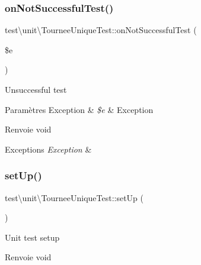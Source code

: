 \subsubsection{\texorpdfstring{on\+Not\+Successful\+Test()}{onNotSuccessfulTest()}}
{\footnotesize\ttfamily test\textbackslash{}unit\textbackslash{}\+Tournee\+Unique\+Test\+::on\+Not\+Successful\+Test (\begin{DoxyParamCaption}\item[{Exception}]{\$e }\end{DoxyParamCaption})\hspace{0.3cm}{\ttfamily [protected]}}

Unsuccessful test


\begin{DoxyParams}[1]{Paramètres}
Exception & {\em \$e} & Exception \\
\hline
\end{DoxyParams}
\begin{DoxyReturn}{Renvoie}
void 
\end{DoxyReturn}

\begin{DoxyExceptions}{Exceptions}
{\em Exception} & \\
\hline
\end{DoxyExceptions}
\mbox{\label{classtest_1_1unit_1_1TourneeUniqueTest_a7a0359a1d6f6a219beeb5023af00919b}} 
\subsubsection{\texorpdfstring{set\+Up()}{setUp()}}
{\footnotesize\ttfamily test\textbackslash{}unit\textbackslash{}\+Tournee\+Unique\+Test\+::set\+Up (\begin{DoxyParamCaption}{ }\end{DoxyParamCaption})\hspace{0.3cm}{\ttfamily [protected]}}

Unit test setup \begin{DoxyReturn}{Renvoie}
void 
\end{DoxyReturn}
\mbox{\label{classtest_1_1unit_1_1TourneeUniqueTest_a40e2bbddcc352427439a49a48b63465d}} 
